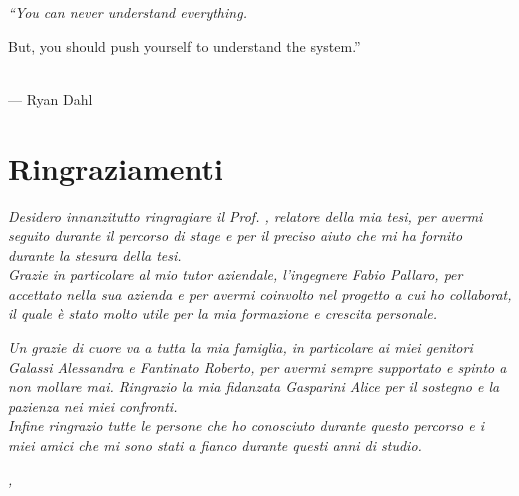 
\cleardoublepage
{}
{}

\begin{flushright}{
	\slshape    
	``You can never understand everything. 
	
	But, you should push yourself to understand the system.''} \\ 
	\medskip
    --- Ryan Dahl
\end{flushright}


\bigskip

\begingroup
\let\clearpage\relax
\let\cleardoublepage\relax
\let\cleardoublepage\relax

\chapter*{Ringraziamenti}

\noindent \textit{Desidero innanzitutto ringragiare il Prof. \myProf, relatore della mia tesi, per avermi seguito durante il percorso di stage e per il preciso aiuto che mi ha fornito durante la stesura della tesi.} \\

\noindent \textit{Grazie in particolare al mio tutor aziendale, l'ingegnere Fabio Pallaro, per accettato nella sua azienda e per avermi coinvolto nel progetto a cui ho collaborat, il quale è stato molto utile per la mia formazione e crescita personale.}

\noindent \textit{Un grazie di cuore va a tutta la mia famiglia, in particolare ai miei genitori Galassi Alessandra e Fantinato Roberto, per avermi sempre supportato e spinto a non mollare mai. Ringrazio la mia fidanzata Gasparini Alice per il sostegno e la pazienza nei miei confronti.}\\

\noindent \textit{Infine ringrazio tutte le persone che ho conosciuto durante questo percorso e i miei amici che mi sono stati a fianco durante questi anni di studio.}\\
\bigskip

\noindent\textit{\myLocation, \myTime}
\hfill \myName

\endgroup
